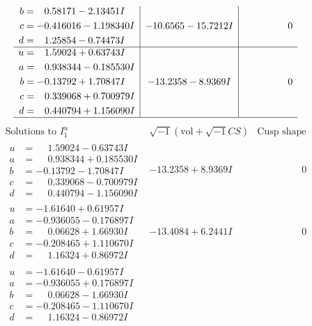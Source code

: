 \documentclass[1p]{elsarticle_modified}
\theoremstyle{definition}
\newcommand{\I}{\sqrt{-1}}
\begin{document}
$$\begin{array}{c|c|c}
\begin{aligned}
b &= \phantom{-}0.58171 - 2.13451 I \\
c &= -0.416016 - 1.198340 I \\
d &= \phantom{-}1.25854 - 0.74473 I\end{aligned}
 & -10.6565 - 15.7212 I & \phantom{-0.000000 } 0 \\ \hline\begin{aligned}
u &= \phantom{-}1.59024 + 0.63743 I \\
a &= \phantom{-}0.938344 - 0.185530 I \\
b &= -0.13792 + 1.70847 I \\
c &= \phantom{-}0.339068 + 0.700979 I \\
d &= \phantom{-}0.440794 + 1.156090 I\end{aligned}
 & -13.2358 - 8.9369 I & \phantom{-0.000000 } 0\\
 \hline 
 \end{array}$$\newpage$$\begin{array}{c|c|c}  
\text{Solutions to }I^u_{1}& \I (\text{vol} + \sqrt{-1}CS) & \text{Cusp shape}\\
 \hline 
\begin{aligned}
u &= \phantom{-}1.59024 - 0.63743 I \\
a &= \phantom{-}0.938344 + 0.185530 I \\
b &= -0.13792 - 1.70847 I \\
c &= \phantom{-}0.339068 - 0.700979 I \\
d &= \phantom{-}0.440794 - 1.156090 I\end{aligned}
 & -13.2358 + 8.9369 I & \phantom{-0.000000 } 0 \\ \hline\begin{aligned}
u &= -1.61640 + 0.61957 I \\
a &= -0.936055 - 0.176897 I \\
b &= \phantom{-}0.06628 + 1.66930 I \\
c &= -0.208465 + 1.110670 I \\
d &= \phantom{-}1.16324 + 0.86972 I\end{aligned}
 & -13.4084 + 6.2441 I & \phantom{-0.000000 } 0 \\ \hline\begin{aligned}
u &= -1.61640 - 0.61957 I \\
a &= -0.936055 + 0.176897 I \\
b &= \phantom{-}0.06628 - 1.66930 I \\
c &= -0.208465 - 1.110670 I \\
d &= \phantom{-}1.16324 - 0.86972 I\end{aligned}

\end{array}$$
\end{document}
